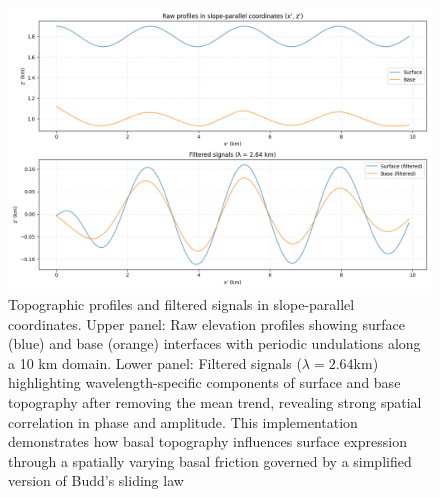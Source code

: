 \begin{figure}
    \includegraphics[scale=0.5]{base_surf_overlap.png}
    \caption{Topographic profiles and filtered signals in slope-parallel coordinates. Upper panel: Raw elevation profiles showing surface (blue) and base (orange) interfaces with periodic undulations along a 10 km domain. Lower panel: Filtered signals ($\lambda = 2.64$km) highlighting wavelength-specific components of surface and base topography after removing the mean trend, revealing strong spatial correlation in phase and amplitude. This implementation demonstrates how basal topography influences surface expression through a spatially varying basal friction governed by a simplified version of Budd's sliding law}
    \label{fig:overlap}
\end{figure}
